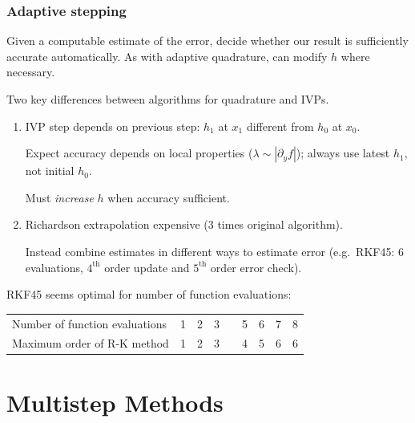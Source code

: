 \documentclass{beamer}
\begin{document}
\begin{frame}
  \frametitle{Adaptive stepping}

  Given a computable estimate of the error, decide whether our result
  is sufficiently accurate automatically. As with adaptive quadrature,
  can modify $h$ where necessary. \pause

  \vspace{1ex}

  Two key differences between algorithms for quadrature and IVPs.
  \begin{enumerate}
  \item IVP step depends on previous step: $h_1$ at $x_1$
    different from $h_0$ at $x_0$. \pause

    \vspace{0.5ex}

    Expect accuracy depends on local properties ($\lambda \sim
    |\partial_y f|$); always use latest $h_1$, not initial $h_0$.

    \vspace{0.5ex}

    Must \emph{increase} $h$ when accuracy sufficient.

    \vspace{0.5ex} \pause

  \item Richardson extrapolation expensive (3 times original
    algorithm). \pause

    \vspace{0.5ex}

    Instead combine estimates in different ways to estimate error
    (e.g.\ RKF45: 6 evaluations, $4^{\text{th}}$ order
    update and $5^{\text{th}}$ order error check).
  \end{enumerate} \pause

  RKF45 seems optimal for number of function evaluations:
  \begin{center}
    \begin{tabular}{l|llll|llll}
      Number of function evaluations & 1 & 2 & 3 & {\color{red}{4}} & 5 & 6 & 7 & 8 \\
      Maximum order of R-K method & 1 & 2 & 3 & {\color{red}{4}} & 4 & 5 & 6 & 6
    \end{tabular}
  \end{center}

\end{frame}


\section{Multistep Methods}
\end{document}
